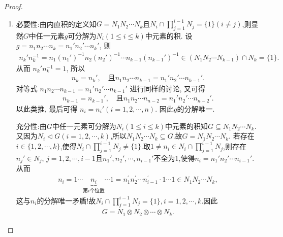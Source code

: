 \documentclass[../../main.tex]{subfiles}%
\begin{document}
\begin{proof}
\begin{enumerate}[(1)]
\item {\heiti 必要性:}由内直积的定义知$G=N_1N_2\cdots N_k$且$N_i\cap \prod_{j=1}^{i-1}{N_j}=\{1\}(i\ne j)$,则显然$G$中任一元素$g$可分解为$N_i(1\leqslant i\leqslant k)$中元素的积.
设 $g=n_1 n_2 \cdots n_k = n_1' n_2' \cdots n_k'$, 则
\begin{align*}
n_k' n_k^{-1} = n_1 (n_1')^{-1} n_2 (n_2')^{-1} \cdots n_{k-1} (n_{k-1}')^{-1} \in (N_1 N_2 \cdots N_{k-1}) \cap N_k = \{1\}.
\end{align*}
从而 $n_k' n_k^{-1} = 1$, 所以
\begin{align*}
n_k = n_k', \quad \text{且} n_1 n_2 \cdots n_{k-1} = n_1' n_2' \cdots n_{k-1}'.
\end{align*}
对等式 $n_1 n_2 \cdots n_{k-1} = n_1' n_2' \cdots n_{k-1}'$ 进行同样的讨论, 又可得
\begin{align*}
n_{k-1} = n_{k-1}', \quad \text{且} n_1 n_2 \cdots n_{n-2} = n_1' n_2' \cdots n_{n-2}'.
\end{align*}
以此类推, 最后可得 $n_i = n_i' (i = 1,2,\cdots,n)$.
因此$g$的分解唯一.

{\heiti 充分性:}由$G$中任一元素可分解为$N_i(1\leqslant i\leqslant k)$中元素的积知$G\subseteq N_1N_2\cdots N_k$.又因为$N_i\lhd G(i=1,2,\cdots,k)$,所以$N_1N_2\cdots N_k\subseteq G$.故$G=N_1N_2\cdots N_k$.
若存在$i\in\{1,2,\cdots,k\}$,使得$N_i\cap \prod_{j=1}^{i-1}{N_j}\ne\{1\}$.取$1\neq n_i\in N_i\cap \prod_{j=1}^{i-1}{N_j}$,则存在$n_j'\in N_j,\,j=1,2,\cdots,i-1$且$n_1',n_2',\cdots,n_{i-1}'$不全为$1$,使得$n_i=n_1'n_2'\cdots n_{i-1}'$.从而
\begin{align*}
n_i=1\cdots \underset{\text{第}i\text{个位置}}{\underbrace{n_i}}\cdots 1=n_{1}^{\prime}n_{2}^{\prime}\cdots n_{i-1}^{\prime}\cdot 1\cdots 1\in N_1N_2\cdots N_k,
\end{align*}
这与$n_i$的分解唯一矛盾!故$N_i\cap \prod_{j=1}^{i-1}{N_j}=\{1\},i=1,2,\cdots,k$.因此
\begin{align*}
G=N_1\otimes N_2\otimes\cdots\otimes N_k.
\end{align*}
\end{enumerate}

\end{proof}
\end{document}
